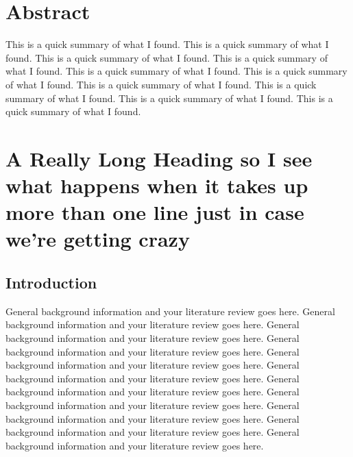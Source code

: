 \documentclass[
  10pt,
]{report}
\begin{document}
\setcounter{tocdepth}{6} %
\cftdot
\singlespacing
\tableofcontents  %

\newpage

\singlespacing
\listoftables %

\newpage

\singlespacing
\listoffigures %

\newpage
\doublespacing

\hypertarget{abstract}{%
\chapter*{Abstract}\label{abstract}}

This is a quick summary of what I found. This is a quick summary of what I found. This is a quick summary of what I found. This is a quick summary of what I found. This is a quick summary of what I found. This is a quick summary of what I found. This is a quick summary of what I found. This is a quick summary of what I found. This is a quick summary of what I found. This is a quick summary of what I found.

\hypertarget{a-really-long-heading-so-i-see-what-happens-when-it-takes-up-more-than-one-line-just-in-case-were-getting-crazy}{%
\chapter{A Really Long Heading so I see what happens when it takes up more than one line just in case we're getting crazy}\label{a-really-long-heading-so-i-see-what-happens-when-it-takes-up-more-than-one-line-just-in-case-were-getting-crazy}}


\hypertarget{introduction}{%
\section{Introduction}\label{introduction}}

General background information and your literature review goes here. General background information and your literature review goes here. General background information and your literature review goes here. General background information and your literature review goes here. General background information and your literature review goes here. General background information and your literature review goes here. General background information and your literature review goes here. General background information and your literature review goes here. General background information and your literature review goes here. General background information and your literature review goes here. General background information and your literature review goes here.
\end{document}
